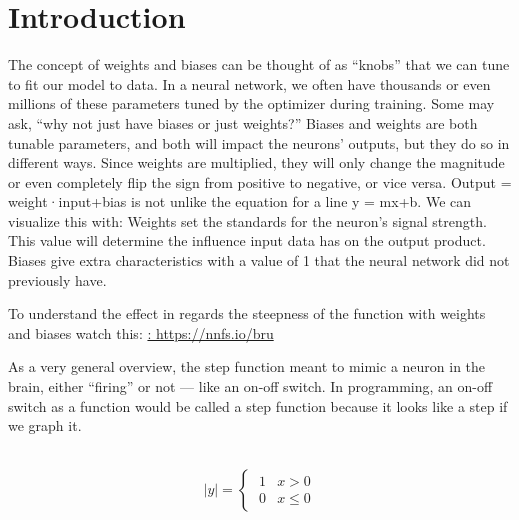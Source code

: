 \section{Introduction}

The concept of weights and biases can be thought of as “knobs” that we can tune to fit our model
to data. In a neural network, we often have thousands or even millions of these parameters tuned
by the optimizer during training. Some may ask, “why not just have biases or just weights?”
Biases and weights are both tunable parameters, and both will impact the neurons’ outputs, but
they do so in different ways. Since weights are multiplied, they will only change the magnitude or
even completely flip the sign from positive to negative, or vice versa. Output = weight·input+bias
is not unlike the equation for a line y = mx+b. We can visualize this with:
Weights set the standards for the neuron's signal strength. This value will determine the influence input data has on the output product. Biases give extra characteristics with a value of 1 that the neural network did not previously have.

To understand the effect in regards the steepness of the function with weights and biases watch this: \url{: https://nnfs.io/bru}

As a very general overview, the step function meant to mimic a neuron in the brain, either “firing”
or not — like an on-off switch. In programming, an on-off switch as a function would be called a
step function because it looks like a step if we graph it.

 \\

\begin{equation*}
    |y| = \begin{cases}
        \;1  & x>0 \\
        \;0 & x \leq 0
    \end{cases}
\end{equation*}


